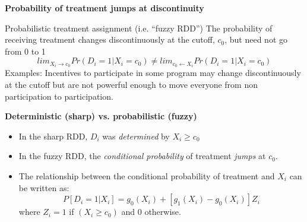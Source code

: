 \documentclass[notes=show]{beamer}
\begin{document}
\begin{frame}[plain]
\begin{center}
\textbf{Probability of treatment jumps at discontinuity}
\end{center}
	
		\begin{block}{Probabilistic treatment assignment (i.e. ``fuzzy RDD'')}
		The probability of receiving treatment changes discontinuously at the cutoff, $c_0$, but need not go from 0 to 1$$lim_{X_i\rightarrow{c_0}}Pr(D_i=1|X_i=c_0) \neq lim_{c_0 \leftarrow X_i} Pr(D_i=1 | X_i=c_0)$$Examples: Incentives to participate in some program may change discontinuously at the cutoff but are not powerful enough to move everyone from non participation to participation.  
		\end{block}
\end{frame}

\begin{frame}[plain]
\begin{center}
\textbf{Deterministic (sharp) vs. probabilistic (fuzzy)}
\end{center}

	\begin{itemize}
		\item In the sharp RDD, $D_i$ was \emph{determined} by $X_i\geq{c_0}$ 
		\item In the fuzzy RDD, the \emph{conditional probability} of treatment \emph{jumps} at $c_0$. 
		\item The relationship between the conditional probability of treatment and $X_i$ can be written as:$$P[D_i=1 | X_i] = g_0(X_i) + [g_1(X_i) - g_0(X_i)]Z_i$$where $Z_i=1$ if $(X_i\geq c_0)$ and $0$ otherwise.
	\end{itemize}

\end{frame}
\end{document}
